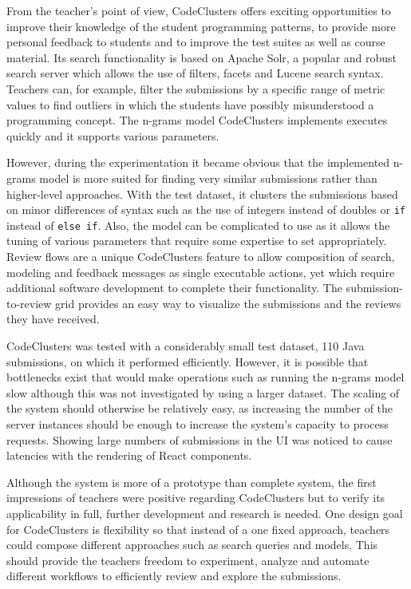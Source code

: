 From the teacher's point of view, CodeClusters offers exciting opportunities to improve their knowledge of the student programming patterns, to provide more personal feedback to students and to improve the test suites as well as course material. Its search functionality is based on Apache Solr, a popular and robust search server which allows the use of filters, facets and Lucene search syntax. Teachers can, for example, filter the submissions by a specific range of metric values to find outliers in which the students have possibly misunderstood a programming concept. The n-grams model CodeClusters implements executes quickly and it supports various parameters.

However, during the experimentation it became obvious that the implemented n-grams model is more suited for finding very similar submissions rather than higher-level approaches. With the test dataset, it clusters the submissions based on minor differences of syntax such as the use of integers instead of doubles or \texttt{if} instead of \texttt{else if}. Also, the model can be complicated to use as it allows the tuning of various parameters that require some expertise to set appropriately. Review flows are a unique CodeClusters feature to allow composition of search, modeling and feedback messages as single executable actions, yet which require additional software development to complete their functionality. The submission-to-review grid provides an easy way to visualize the submissions and the reviews they have received.

CodeClusters was tested with a considerably small test dataset, 110 Java submissions, on which it performed efficiently. However, it is possible that bottlenecks exist that would make operations such as running the n-grams model slow although this was not investigated by using a larger dataset. The scaling of the system should otherwise be relatively easy, as increasing the number of the server instances should be enough to increase the system's capacity to process requests. Showing large numbers of submissions in the UI was noticed to cause latencies with the rendering of React components.

Although the system is more of a prototype than complete system, the first impressions of teachers were positive regarding CodeClusters but to verify its applicability in full, further development and research is needed. One design goal for CodeClusters is flexibility so that instead of a one fixed approach, teachers could compose different approaches such as search queries and models. This should provide the teachers freedom to experiment, analyze and automate different workflows to efficiently review and explore the submissions. 

